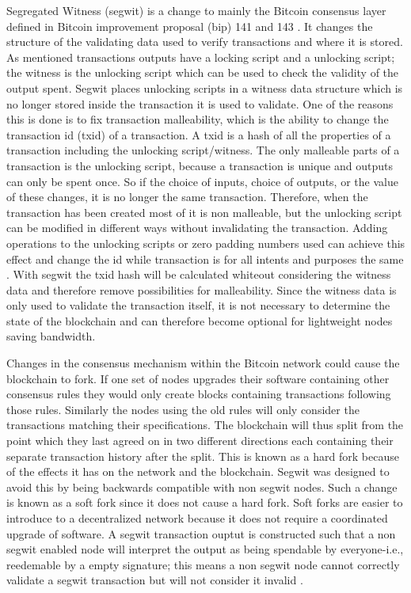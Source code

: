 Segregated Witness (segwit) is a change to mainly the Bitcoin consensus layer defined in Bitcoin improvement proposal (bip) 141 and 143 \cite{BIP141}\cite{BIP143}. It changes the structure of the validating data used to verify transactions and where it is stored. As mentioned transactions outputs have a locking script and a unlocking script; the witness is the unlocking script which can be used to check the validity of the output spent. Segwit places unlocking scripts in a witness data structure which is no longer stored inside the transaction it is used to validate. One of the reasons this is done is to fix transaction malleability, which is the ability to change the transaction id (txid) of a transaction. A txid is a hash of all the properties of a transaction including the unlocking script/witness. The only malleable parts of a transaction is the unlocking script, because a transaction is unique and outputs can only be spent once. So if the choice of inputs, choice of outputs, or the value of these changes, it is no longer the same transaction.
Therefore, when the transaction has been created most of it is non malleable, but the unlocking script can be modified in different ways without invalidating the transaction. Adding operations to the unlocking scripts or zero padding numbers used can achieve this effect and change the id while transaction is for all intents and purposes the same \cite{BIP62}. With segwit the txid hash will be calculated whiteout considering the witness data and therefore remove possibilities for malleability. Since the witness data is only used to validate the transaction itself, it is not necessary to determine the state of the blockchain and can therefore become optional for lightweight nodes saving bandwidth. 

Changes in the consensus mechanism within the Bitcoin network could cause the blockchain to fork. If one set of nodes upgrades their software containing other consensus rules they would only create blocks containing transactions following those rules. Similarly the nodes using the old rules will only consider the transactions matching their specifications. The blockchain will thus split from the point which they last agreed on in two different directions each containing their separate transaction history after the split. This is known as a hard fork because of the effects it has on the network and the blockchain. Segwit was designed to avoid this by being backwards compatible with non segwit nodes. Such a change is known as a soft fork since it does not cause a hard fork. Soft forks are easier to introduce to a decentralized network because it does not require a coordinated upgrade of software. A segwit transaction ouptut is constructed such that a non segwit enabled node will interpret the output as being spendable by everyone-i.e., reedemable by a empty signature; this means a non segwit node cannot correctly validate a segwit transaction but will not consider it invalid \cite{antonopoulos2017mastering}. 

